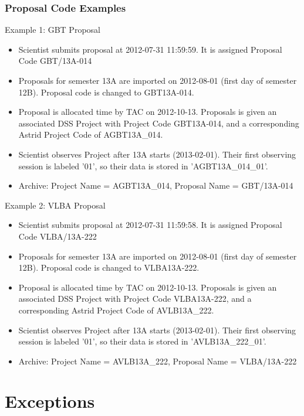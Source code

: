 \documentclass{article}
\begin{document}
\subsubsection{Proposal Code Examples}

Example 1: GBT Proposal

\begin{itemize}
\item Scientist submits proposal at 2012-07-31 11:59:59.  It is assigned
Proposal Code GBT/13A-014
\item Proposals for semester 13A are imported on 2012-08-01 (first day of semester 12B).  Proposal code is changed to GBT13A-014.
\item Proposal is allocated time by TAC on 2012-10-13.  Proposals is given an associated DSS Project with Project Code GBT13A-014, and a corresponding Astrid Project Code of AGBT13A\_014.
\item Scientist observes Project after 13A starts (2013-02-01).  Their first observing session is labeled '01', so their data is stored in 'AGBT13A\_014\_01'.
\item Archive: Project Name = AGBT13A\_014, Proposal Name = GBT/13A-014
\end{itemize}

Example 2: VLBA Proposal

\begin{itemize}
\item Scientist submits proposal at 2012-07-31 11:59:58.  It is assigned
Proposal Code VLBA/13A-222
\item Proposals for semester 13A are imported on 2012-08-01 (first day of semester 12B).  Proposal code is changed to VLBA13A-222.
\item Proposal is allocated time by TAC on 2012-10-13.  Proposals is given an associated DSS Project with Project Code VLBA13A-222, and a corresponding Astrid Project Code of AVLB13A\_222.
\item Scientist observes Project after 13A starts (2013-02-01).  Their first observing session is labeled '01', so their data is stored in 'AVLB13A\_222\_01'.
\item Archive: Project Name = AVLB13A\_222, Proposal Name = VLBA/13A-222
\end{itemize}

\section{Exceptions}\label{exceptions_sec}
\end{document}
